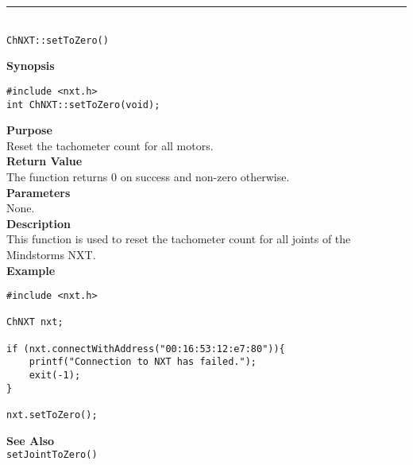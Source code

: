 \noindent
\vspace{5pt}
\rule{4.5in}{0.015in}\\
\noindent
{\LARGE \texttt{ChNXT::setToZero()} }\\


\noindent
{\bf Synopsis}
\begin{lstlisting}
#include <nxt.h>
int ChNXT::setToZero(void);
\end{lstlisting}

\noindent
{\bf Purpose}\\
Reset the tachometer count for all motors.\\

\noindent
{\bf Return Value}\\
The function returns 0 on success and non-zero otherwise.\\

\noindent
{\bf Parameters}\\
None.\\

\noindent
{\bf Description}\\
This function is used to reset the tachometer count for 
all joints of the Mindstorms NXT.\\

\noindent
{\bf Example}
\begin{lstlisting}
#include <nxt.h> 

ChNXT nxt;

if (nxt.connectWithAddress("00:16:53:12:e7:80")){
    printf("Connection to NXT has failed.");
    exit(-1);
}
    
nxt.setToZero();
\end{lstlisting}

\noindent
{\bf See Also}\\
\texttt{setJointToZero()}\\
